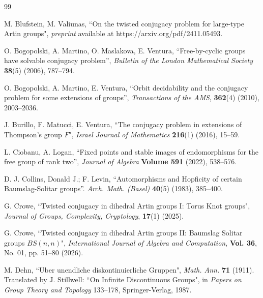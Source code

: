 \documentclass[a4paper]{amsart}
\theoremstyle{definition}
\begin{document}
\begin{thebibliography}{99}


 M. Blufstein, M. Valiunas, ``On the twisted conjugacy problem for large-type Artin groups", \emph{preprint} available at https://arxiv.org/pdf/2411.05493. 

 O. Bogopolski, A. Martino, O. Maslakova, E. Ventura, ``Free-by-cyclic groups have solvable conjugacy problem'', \textit{Bulletin of the London Mathematical Society} \textbf{38}(5) (2006), 787--794.

 O. Bogopolski, A. Martino, E. Ventura, ``Orbit decidability and the conjugacy problem for some extensions of groups'', \textit{Transactions of the AMS}, \textbf{362}(4) (2010),  2003--2036. 


 J. Burillo, F. Matucci, E. Ventura, ``The conjugacy problem in extensions of Thompson's group $F$", \emph{Israel Journal of Mathematics} \textbf{216}(1) (2016), 15--59.

 L. Ciobanu, A. Logan, ``Fixed points and stable images of endomorphisms for the free group of rank two'', \emph{Journal of Algebra} \textbf{Volume 591} (2022), 538--576.

 D. J. Collins, Donald J.; F. Levin, ``Automorphisms and Hopficity of certain Baumslag-Solitar groups''. \emph{Arch. Math. (Basel)} \textbf{40}(5) (1983), 385--400.

 G. Crowe, ``Twisted conjugacy in dihedral Artin groups I: Torus Knot groups", \emph{Journal of Groups, Complexity, Cryptology}, \textbf{17}(1) (2025).

 G. Crowe, ``Twisted conjugacy in dihedral Artin groups II: Baumslag Solitar groups $BS(n,n)$", \emph{International Journal of Algebra and Computation}, \textbf{Vol. 36}, No. 01, pp. 51--80 (2026). 

 M. Dehn, ``Uber unendliche diskontinuierliche Gruppen", \emph{Math. Ann.} \textbf{71} (1911). Translated by J. Stillwell: ``On Infinite Discontinuous Groups", in \emph{Papers on Group Theory and Topology} 133--178, Springer-Verlag, 1987.


\end{thebibliography}
\end{document}
